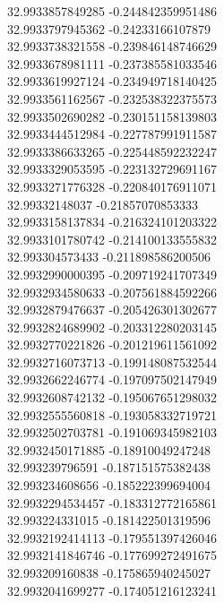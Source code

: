{32.9933857849285	-0.244842359951486\\
32.9933797945362	-0.24233166107879\\
32.9933738321558	-0.239846148746629\\
32.9933678981111	-0.237385581033546\\
32.9933619927124	-0.234949718140425\\
32.9933561162567	-0.232538322375573\\
32.9933502690282	-0.230151158139803\\
32.9933444512984	-0.227787991911587\\
32.9933386633265	-0.225448592232247\\
32.9933329053595	-0.223132729691167\\
32.9933271776328	-0.220840176911071\\
32.99332148037	-0.21857070853333\\
32.9933158137834	-0.216324101203322\\
32.9933101780742	-0.214100133555832\\
32.993304573433	-0.211898586200506\\
32.9932990000395	-0.209719241707349\\
32.9932934580633	-0.207561884592266\\
32.9932879476637	-0.205426301302677\\
32.9932824689902	-0.203312280203145\\
32.9932770221826	-0.201219611561092\\
32.9932716073713	-0.199148087532544\\
32.9932662246774	-0.197097502147949\\
32.9932608742132	-0.195067651298032\\
32.9932555560818	-0.193058332719721\\
32.9932502703781	-0.191069345982103\\
32.9932450171885	-0.18910049247248\\
32.993239796591	-0.187151575382438\\
32.993234608656	-0.185222399694004\\
32.9932294534457	-0.183312772165861\\
32.993224331015	-0.181422501319596\\
32.9932192414113	-0.179551397426046\\
32.9932141846746	-0.177699272491675\\
32.993209160838	-0.175865940245027\\
32.9932041699277	-0.174051216123241\\
}
